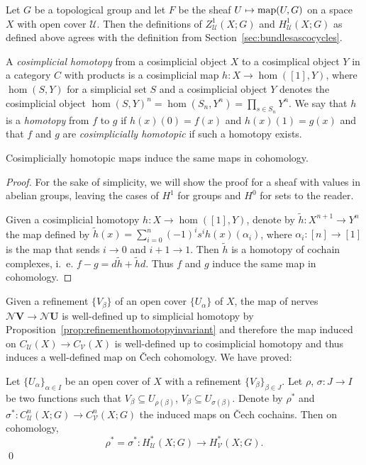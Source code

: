 \documentclass[a4paper,openany]{scrbook}
\newcommand{\nerve}{\mathcal N}
\begin{document}
\begin{exer}
	Let $G$ be a topological group and let $F$ be the sheaf $U \mapsto \operatorname{map}(U,G)$ on a space $X$ with open cover $\mathcal{U}$. Then the definitions of $Z^1_{\mathcal U}(X;G)$ and $H^1_{\mathcal{U}}(X;G)$ as defined above agrees with the definition from Section~\ref{sec:bundlesascocycles}.
\end{exer}	
	
	

\begin{defn}
A \emph{cosimplicial homotopy} from a cosimplicial object $X$ to a cosimplical object $Y$ in a category $C$ with products is a cosimplicial map $h\colon X \to \hom([1],Y)$, where $\hom(S,Y)$ for a simplicial set $S$ and a cosimplicial object $Y$ denotes the cosimplicial object $\hom(S,Y)^n = \hom(S_n,Y^n) = \prod_{s \in S_n} Y^n$. We say that $h$ is a \textit{homotopy} from $f$ to $g$ if $h(x)(0)=f(x)$ and $h(x)(1)=g(x)$ and that $f$ and $g$ are \emph{cosimplicially homotopic} if such a homotopy exists. 
\end{defn}

\begin{lemma}\label{lemma:cosimphomotopicmaps}
Cosimplicially homotopic maps induce the same maps in cohomology.
\end{lemma}
\begin{proof}
For the sake of simplicity, we will show the proof for a sheaf with values in abelian groups, leaving the cases of $H^1$ for groups and $H^0$ for sets to the reader.

Given a cosimplicial homotopy $h\colon X \to \hom([1],Y)$, denote by $\tilde h\colon X^{n+1} \to Y^n$ the map defined by $\tilde h(x) = \sum_{i=0}^n (-1)^i s^i h(x)(\alpha_i)$, where $\alpha_i\colon [n]\to[1]$ is the map that sends $i \to 0$ and $i+1 \to 1$. Then $\tilde h$ is a homotopy of cochain complexes, i.~e. $f-g = d\tilde h + \tilde h d$.  Thus $f$ and $g$ induce the same map in cohomology.
\end{proof}

Given a refinement $\{V_\beta\}$ of an open cover $\{U_\alpha\}$ of $X$, the map of nerves $\nerve \mathbf V \to \nerve \mathbf U$ is well-defined up to simplicial homotopy by Proposition~\ref{prop:refinementhomotopyinvariant} and therefore the map induced on $C_{\mathcal U}(X) \to C_{\mathcal V}(X)$ is well-defined up to cosimplicial homotopy and thus induces a well-defined map on Čech cohomology. We have proved:

\begin{thm}\label{thm:welldefinedrefinement}
Let $\{U_\alpha\}_{\alpha \in I}$ be an open cover of $X$ with a refinement $\{V_\beta\}_{\beta \in J}$. Let $\rho$, $\sigma\colon J \to I$ be two functions such that $V_{\beta} \subseteq U_{\rho(\beta)}$, $V_\beta \subseteq U_{\sigma(\beta)}$. Denote by $\rho^*$ and $\sigma^*\colon C^n_{\mathcal U}(X;G) \to C^n_{\mathcal V}(X;G)$ the induced maps on Čech cochains. Then on cohomology,
\[
\rho^* = \sigma^*\colon H^*_{\mathcal U}(X;G) \to H^*_{\mathcal V}(X;G).
\]\qed
\end{thm}
\end{document}
